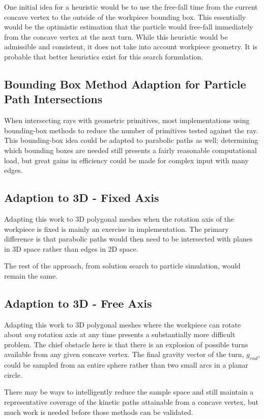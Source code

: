 One initial idea for a heuristic would be to use the free-fall time from the current concave vertex to the outside of the workpiece bounding box. This essentially would be the optimistic estimation that the particle would free-fall immediately from the concave vertex at the next turn. While this heuristic would be admissible and consistent, it does not take into account workpiece geometry. It is probable that better heuristics exist for this search formulation.

  \subsection{Bounding Box Method Adaption for Particle Path Intersections}

When intersecting rays with geometric primitives, most implementations using bounding-box methods to reduce the number of primitives tested against the ray. This bounding-box idea could be adapted to parabolic paths as well; determining which bounding boxes are needed still presents a fairly reasonable computational load, but great gains in efficiency could be made for complex input with many edges.

  \subsection{Adaption to 3D - Fixed Axis}

Adapting this work to 3D polygonal meshes when the rotation axis of the workpiece is fixed is mainly an exercise in implementation. The primary difference is that parabolic paths would then need to be intersected with planes in 3D space rather than edges in 2D space.

The rest of the approach, from solution search to particle simulation, would remain the same.

  \subsection{Adaption to 3D - Free Axis}

Adapting this work to 3D polygonal meshes where the workpiece can rotate about \emph{any} rotation axis at any time presents a substantially more difficult problem. The chief obstacle here is that there is an explosion of possible turns available from any given concave vertex. The final gravity vector of the turn, $g_{end}$, could be sampled from an entire sphere rather than two small arcs in a planar circle.

There may be ways to intelligently reduce the sample space and still maintain a representative coverage of the kinetic paths attainable from a concave vertex, but much work is needed before those methods can be validated.

